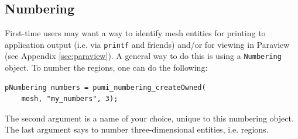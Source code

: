 \documentclass{article}
\begin{document}
\subsection{Numbering}
\label{sec:num}

First-time users may want a way to identify mesh entities for
printing to application output (i.e. via \texttt{printf} and friends)
and/or for viewing in Paraview (see Appendix \ref{sec:paraview}).
A general way to do this is using a \texttt{Numbering} object.
To number the regions, one can do the following:

\begin{lstlisting}
pNumbering numbers = pumi_numbering_createOwned(
    mesh, "my_numbers", 3);
\end{lstlisting}

The second argument is a name of your choice, unique to this numbering object.
The last argument says to number three-dimensional entities, i.e. regions.
\end{document}
